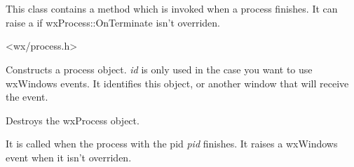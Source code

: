 \section{}\label{wxprocess}

This class contains a method which is invoked when a process finishes.
It can raise a  if wxProcess::OnTerminate
isn't overriden.




<wx/process.h>


\label{wxprocessconstr}


Constructs a process object. {\it id} is only used in the case you want to
use wxWindows events. It identifies this object, or another window that will
receive the event.






Destroys the wxProcess object.

\label{wxprocessonterminate}


It is called when the process with the pid {\it pid} finishes.
It raises a wxWindows event when it isn't overriden.



